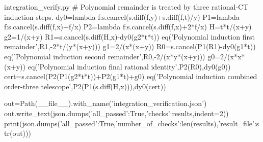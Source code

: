 \begin{filecontents*}[overwrite]{integration_verify.py}
# Polynomial remainder is treated by three rational-CT induction steps.
dy0=lambda f:s.cancel(s.diff(f,y)+s.diff(f,t)/y)
P1=lambda f:s.cancel(s.diff(f,x)+f/x)
P2=lambda f:s.cancel(s.diff(f,x)+2*f/x)
H=t*t/(x+y)
g2=1/(x+y)
R1=s.cancel(s.diff(H,x)-dy0(g2*t*t))
eq('Polynomial induction first remainder',R1,-2*t/(y*(x+y)))
g1=2/(x*(x+y))
R0=s.cancel(P1(R1)-dy0(g1*t))
eq('Polynomial induction second remainder',R0,-2/(x*y*(x+y)))
g0=2/(x*x*(x+y))
eq('Polynomial induction final rational identity',P2(R0),dy0(g0))
cert=s.cancel(P2(P1(g2*t*t))+P2(g1*t)+g0)
eq('Polynomial induction combined order-three telescope',P2(P1(s.diff(H,x))),dy0(cert))

out=Path(__file__).with_name('integration_verification.json')
out.write_text(json.dumps({'all_passed':True,'checks':results},indent=2))
print(json.dumps({'all_passed':True,'number_of_checks':len(results),'result_file':str(out)}))
\end{filecontents*}
